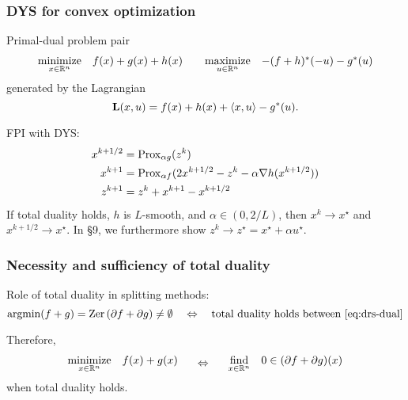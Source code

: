 \documentclass[10pt,mathserif]{beamer}
\begin{document}
\begin{frame}
\frametitle{DYS for convex optimization}
Primal-dual problem pair
\[
\begin{array}{ll}
\underset{x\in \mathbb{R}^n}{\mbox{minimize}}&f(x)+g(x)+h(x)
\end{array}
\quad
\begin{array}{ll}
\underset{u \in \mathbb{R}^n}{\mbox{maximize}}&-(f+h)^*(-u)-g^*(u)
\end{array}
\]
generated by the Lagrangian
\[
\mathbf{L}(x,u)=f(x)+h(x)+\langle x,u\rangle-g^*(u).
\]



FPI with DYS:
\begin{align*}
x^{k+1/2}&=\mathrm{Prox}_{\alpha g}(z^k)\\
x^{k+1}&=\mathrm{Prox}_{\alpha f}(2x^{k+1/2}-z^k-\alpha \nabla h(x^{k+1/2}))\\
z^{k+1}&=z^k+x^{k+1}-x^{k+1/2}
\end{align*}
If total duality holds, $h$ is $L$-smooth, and $\alpha\in(0,2/L)$, then $x^k\rightarrow x^\star$ and $x^{k+1/2}\rightarrow x^\star$.
In \S9, we furthermore show $z^k\rightarrow z^\star=x^\star+\alpha u^\star$.


\end{frame}



\begin{frame}
\frametitle{Necessity and sufficiency of total duality}
Role of total duality in splitting methods:
\[
 \operatorname*{argmin}(f+g)= \mathrm{Zer}\,(\partial f+\partial g)\ne \emptyset
 \quad\Leftrightarrow\quad
 \text{total duality holds between
 \eqref{eq:drs-dual}}
 \]

 \vspace{0.2in}
 Therefore,
 \[
\begin{array}{ll}
\underset{x\in\mathbb{R}^n}{\mathrm{minimize}} &
f(x)+g(x)
\end{array}
\quad\Leftrightarrow\quad
\begin{array}{ll}
\underset{x\in\mathbb{R}^n}{\mathrm{find}} &
0\in (\partial f+\partial g)(x)
\end{array}
\]
when total duality holds.



\end{frame}
\end{document}
